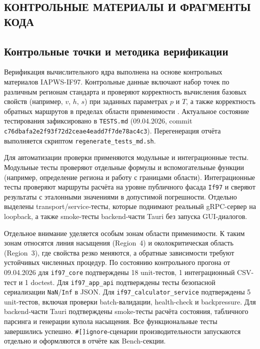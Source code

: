 \clearpage
\begin{appendices}
\renewcommand{\thechapter}{\Asbuk{chapter}}
\titleformat{\chapter}[display]{\filcenter}{\MakeUppercase{Приложение} \thechapter}{0pt}{\bfseries}

\chapter{КОНТРОЛЬНЫЕ МАТЕРИАЛЫ И ФРАГМЕНТЫ КОДА}

\section{Контрольные точки и методика верификации}

Верификация вычислительного ядра выполнена на основе контрольных материалов IAPWS-IF97.  
Контрольные данные включают набор точек по различным регионам стандарта и проверяют корректность вычисления базовых свойств (например, $v$, $h$, $s$) при заданных параметрах $p$ и $T$, а также корректность обратных маршрутов в пределах области применимости \cite{iapws_if97_2012}.  
Актуальное состояние тестирования зафиксировано
в \texttt{TESTS.md}
(09.04.2026, commit \texttt{c76dbafa2e2f93f72d2ceae4eadd7f7de78ac4c3}).
Перегенерация отчёта выполняется скриптом \texttt{regenerate\_tests\_md.sh}.

Для автоматизации проверки применяются модульные и интеграционные тесты.  
Модульные тесты проверяют отдельные формулы и вспомогательные функции (например, определение региона и работу с границами области).  
Интеграционные тесты проверяют маршруты расчёта на уровне публичного фасада \texttt{If97} и сверяют результаты с эталонными значениями в допустимой погрешности.  
Отдельно выделены transport/service-тесты,
которые поднимают реальный gRPC-сервер на loopback,
а также smoke-тесты backend-части Tauri
без запуска GUI-диалогов.

Отдельное внимание уделяется особым зонам области применимости.  
К таким зонам относятся линия насыщения (Region~4) и околокритическая область (Region~3), где свойства резко меняются, а обратные зависимости требуют устойчивых численных процедур.  
По состоянию контрольного прогона от 09.04.2026
для \texttt{if97\_core} подтверждены
18 unit-тестов, 1 интеграционный CSV-тест и 1 doctest.
Для \texttt{if97\_app\_api}
подтверждены тесты безопасной сериализации
\texttt{NaN}/\texttt{Inf} в JSON.
Для \texttt{if97\_calculator\_service}
подтверждены 5 unit-тестов,
включая проверки batch-валидации, health-check и backpressure.
Для backend-части Tauri
подтверждены smoke-тесты
расчёта состояния, табличного парсинга
и генерации купола насыщения.
Все функциональные тесты завершились успешно.
\texttt{\#[]ignore}-сценарии производительности
запускаются отдельно и оформляются в отчёте как Bench-секции.


\end{appendices}
